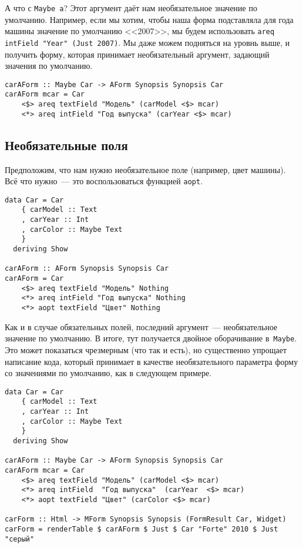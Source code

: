 А что с \lstinline'Maybe a'? Этот аргумент даёт нам необязательное
значение по умолчанию.  Например, если мы хотим, чтобы наша форма подставляла
для года машины значение по умолчанию <<2007>>, мы будем использовать
\lstinline'areq intField "Year" (Just 2007)'. Мы даже можем подняться на
уровнь выше, и получить форму, которая принимает необязательный аргумент,
задающий значения по умолчанию.

\begin{lstlisting}[caption={Формы со значениями по умолчанию}]
carAForm :: Maybe Car -> AForm Synopsis Synopsis Car
carAForm mcar = Car
    <$> areq textField "Модель" (carModel <$> mcar)
    <*> areq intField "Год выпуска" (carYear <$> mcar)
\end{lstlisting}%

\subsection{Необязательные поля}
Предположим, что нам нужно необязательное поле (например, цвет машины). Всё
что нужно~--- это воспользоваться функцией \lstinline'aopt'.

\begin{lstlisting}[caption={Необязательные поля}]
data Car = Car
    { carModel :: Text
    , carYear :: Int
    , carColor :: Maybe Text
    }
  deriving Show

carAForm :: AForm Synopsis Synopsis Car
carAForm = Car
    <$> areq textField "Модель" Nothing
    <*> areq intField "Год выпуска" Nothing
    <*> aopt textField "Цвет" Nothing
\end{lstlisting}%

Как и в случае обязательных полей, последний аргумент~--- необязательное
значение по умолчанию.  В итоге, тут получается двойное оборачивание
в~\lstinline'Maybe'. Это может показаться чрезмерным (что так и есть), но
существенно упрощает написание кода, который принимает в качестве
необязательного параметра форму со значениями по умолчанию, как в следующем
примере.

\begin{lstlisting}[caption={Необязательные поля со значениями по умолчанию}]
data Car = Car
    { carModel :: Text
    , carYear :: Int
    , carColor :: Maybe Text
    }
  deriving Show

carAForm :: Maybe Car -> AForm Synopsis Synopsis Car
carAForm mcar = Car
    <$> areq textField "Модель" (carModel <$> mcar)
    <*> areq intField  "Год выпуска"  (carYear  <$> mcar)
    <*> aopt textField "Цвет" (carColor <$> mcar)

carForm :: Html -> MForm Synopsis Synopsis (FormResult Car, Widget)
carForm = renderTable $ carAForm $ Just $ Car "Forte" 2010 $ Just "серый"
\end{lstlisting}

